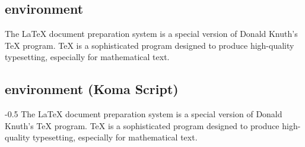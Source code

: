 \subsection{ environment}

\begin{filecontents*}{\democodefile}
\begin{abstract}
\LaTeX{} is a document markup language and document preparation 
system for the \TeX{} typesetting program.
\end{abstract}
The \LaTeX{} document preparation system is a special version of Donald
Knuth's \TeX{} program. \TeX{} is a sophisticated program designed to 
produce high-quality typesetting, especially for mathematical text.
\end{filecontents*}

%

\subsection{ environment (Koma Script)}
\label{sec:EnvAddmargin}


\begin{filecontents*}{\democodefile}
\begin{addmargin*}[0cm]{-0.5\marginwidth}
The \LaTeX{} document preparation system is a special version of Donald
Knuth's \TeX{} program. \TeX{} is a sophisticated program designed to 
produce high-quality typesetting, especially for mathematical text.
\end{addmargin*}
\end{filecontents*}

%


